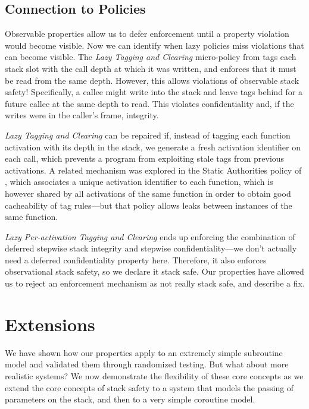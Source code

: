 \documentclass[acmsmall,review,anonymous]{acmart}\settopmatter{printfolios=true,printccs=false,printacmref=false}
\begin{document}
{\subsection{Connection to Policies}

Observable properties allow us to defer enforcement until a property
violation would become visible. Now we can identify when lazy policies
miss violations that can become visible. The {\em Lazy Tagging and Clearing}
micro-policy from \citet{DBLP:conf/sp/RoesslerD18} tags each stack slot with the call depth
at which it was written, and enforces that it must be read from the
same depth. However, this allows violations of observable stack safety!
Specifically, a callee might write into the stack and leave tags behind
for a future callee at the same depth to read. This violates confidentiality and,
if the writes were in the caller's frame, integrity.

{\em Lazy Tagging and Clearing} can be repaired if, instead of tagging each function
activation with its depth in the stack, we generate a fresh activation
identifier on each call, which prevents a program from exploiting stale
tags from previous activations. A related mechanism was explored in the
Static Authorities policy of \citet{DBLP:conf/sp/RoesslerD18}, which
associates a unique activation identifier to each function, which is
however shared by all activations of the same function in order to obtain
good cacheability of tag rules---but that policy allows leaks between
instances of the same function.

{\em Lazy Per-activation Tagging and Clearing} ends up enforcing the combination
of deferred stepwise stack integrity and stepwise confidentiality---we
don't actually need a deferred confidentiality property here. Therefore,
it also enforces observational stack safety, so we declare it stack safe.
Our properties have allowed us to reject an enforcement mechanism as
not really stack safe, and describe a fix.

\section{Extensions}
\label{sec:ext}

We have shown how our properties apply to an extremely simple
subroutine model and validated them through randomized testing.
But what about more realistic systems? We now demonstrate the
flexibility of these core concepts as we extend
the core concepts of stack safety to a system that models the passing of
parameters on the stack, and then to a very simple coroutine model.

}
\end{document}
